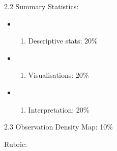 \documentclass[
  10pt,
]{article}
\providecommand{\tightlist}{%
  \setlength{\itemsep}{0pt}\setlength{\parskip}{0pt}}
\begin{document}
2.2 Summary Statistics:

\begin{itemize}
\tightlist
\item
  \begin{enumerate}
  \def\labelenumi{(\arabic{enumi})}
  \tightlist
  \item
    Descriptive stats: 20\%
  \end{enumerate}
\item
  \begin{enumerate}
  \def\labelenumi{(\arabic{enumi})}
  \setcounter{enumi}{1}
  \tightlist
  \item
    Visualisations: 20\%
  \end{enumerate}
\item
  \begin{enumerate}
  \def\labelenumi{(\arabic{enumi})}
  \setcounter{enumi}{2}
  \tightlist
  \item
    Interpretation: 20\%
  \end{enumerate}
\end{itemize}

2.3 Observation Density Map: 10\%

Rubric:
\end{document}
